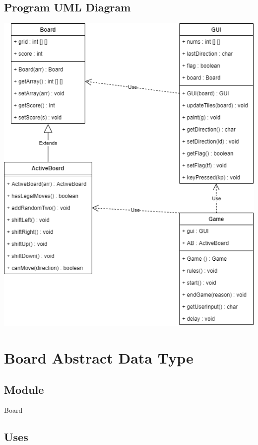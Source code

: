 \documentclass[12pt]{article}
\begin{document}
\subsection*{Program UML Diagram}
\begin{center}
    \includegraphics[scale=0.5]{A4UML.png}
\end{center}


\newpage

\section* {Board Abstract Data Type}

\subsection*{Module}

Board

\subsection* {Uses}
\end{document}
